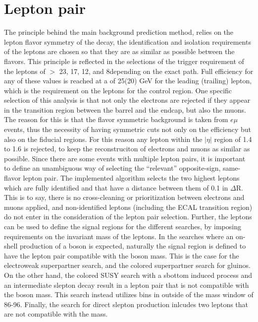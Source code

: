 \section{Lepton pair}\label{sec:lepSelection}
\noindent
\justify
The principle behind the main background prediction method, relies on the lepton flavor symmetry of the \PW decay, the identification and isolation requirements of the leptons are chosen so that they are as similar as possible between the flavors. 
This principle is reflected in the selections of the trigger requirement of the leptons of \pt $>$ 23, 17, 12, and 8\GeV depending on the exact path. 
Full efficiency for any of these values is reached at a \pt of 25(20) GeV for the leading (trailing) lepton, which is the requirement on the leptons for the control region. 
One specific selection of this analysis is that not only the electrons are rejected if they appear in the transition region between the barrel and the endcap, but also the muons. 
The reason for this is that the flavor symmetric background is taken from $e\mu$ events, thus the necessity of having symmetric cuts not only on the efficiency but also on the fiducial regions. 
For this reason any lepton within the $|\eta|$ region of 1.4 to 1.6 is rejected, to keep the reconstruciton of electrons and muons as similar as possible. 
Since there are some events with multiple lepton pairs, it is important to define an unambiguous way of selecting the ``relevant''  opposite-sign, same-flavor lepton pair. 
The implemented algorithm selects the two highest \pt leptons which are fully identified and that have a distance between them of 0.1 in $\Delta$R. 
This is to say, there is no cross-cleaning or prioritization between electrons and muons applied, and non-identified leptons (including the ECAL transition region) do not enter in the consideration of the lepton pair selection. 
Further, the leptons can be used to define the signal regions for the different searches, by imposing requirements on the invariant mass of the leptons. 
In the searches where an on-shell production of a \PZ boson is expected, naturally the signal region is defined to have the lepton pair compatible with the \PZ boson mass.  
This is the case for the electroweak superpartner search, and the colored superpartner search for gluinos. 
On the other hand, the colored SUSY search with a sbottom induced process and an intermediate slepton decay result in a lepton pair that is not compatible with the \PZ boson mass. 
This search instead utilizes bins in \mll outside of the \PZ mass window of 86-96\GeV. 
Finally, the search for direct slepton production inlcudes two leptons that are not compatible with the \PZ mass. 
